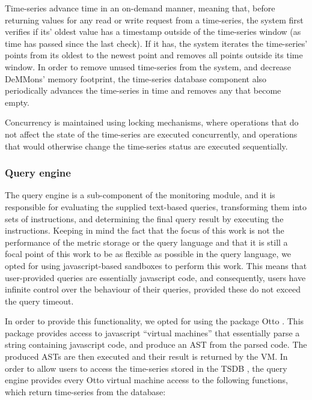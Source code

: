 Time-series advance time in an on-demand manner, meaning that, before returning values for any read or write request from a time-series, the system first verifies if its' oldest value has a timestamp outside of the time-series window (as time has passed since the last check). If it has, the system iterates the time-series' points from its oldest to the newest point and removes all points outside its time window. In order to remove unused time-series from the system, and decrease DeMMons' memory footprint, the time-series database component also periodically advances the time-series in time and removes any that become empty.

Concurrency is maintained using locking mechanisms, where operations that do not affect the state of the time-series are executed concurrently, and operations that would otherwise change the time-series status are executed sequentially. 



\subsubsection{Query engine} \label{sec:mon_module:query_engine}

The query engine is a sub-component of the monitoring module, and it is responsible for evaluating the supplied text-based queries, transforming them into sets of instructions, and determining the final query result by executing the instructions. Keeping in mind the fact that the focus of this work is not the performance of the metric storage or the query language and that it is still a focal point of this work to be as flexible as possible in the query language, we opted for using javascript-based sandboxes to perform this work. This means that user-provided queries are essentially javascript code, and consequently, users have infinite control over the behaviour of their queries, provided these do not exceed the query timeout.

In order to provide this functionality, we opted for using the package Otto \cite{otto}. This package provides access to javascript ``virtual machines'' that essentially parse a string containing javascript code, and produce an AST from the parsed code. The produced ASTs are then executed and their result is returned by the VM. In order to allow users to access the time-series stored in the TSDB , the query engine provides every Otto virtual machine access to the following functions, which return time-series from the database:

